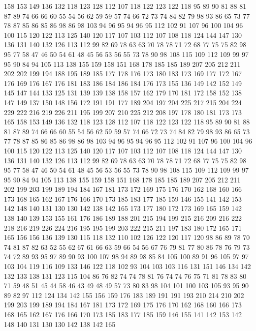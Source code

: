 158 153 149 136 132 118 123 128 112 107 118 122 123 122 118 95 89 90 81 88
81 87 89 74 66 66 60 55 54 56 62 59 59 57 74 66 72 73 74 84
82 79 98 93 86 65 73 77 78 87 85 86 85 86 98 86 98 103 94 96
95 94 96 95 112 102 91 107 96 100 104 96 100 115 120 122 113 125 140 120
117 107 103 112 107 108 118 124 144 147 130 136 131 140 132 126 113 112 99 82
69 78 63 63 70 78 78 71 72 68 77 75 75 82 98 95 77 58 47 46
50 54 61 48 45 56 53 56 55 73 78 90 98 108 115 109 112 109 99 97
95 90 84 94 105 113 138 155 159 158 151 168 178 185 185 189 207 205 212 211
202 202 199 194 188 195 189 185 177 178 176 173 180 183 173 169 177 172 167 176
169 176 167 176 181 183 186 184 186 184 176 173 155 136 149 142 152 149 145 147
144 133 125 131 139 139 138 158 157 162 179 170 181 172 158 152 138 147 149 137
150 148 156 172 191 191 177 189 204 197 204 225 217 215 204 224 229 222 216 219
226 211 195 199 207 210 225 212 208 197 178 180 181 173 173 165 158 153 149 136
132 118 123 128 112 107 118 122 123 122 118 95 89 90 81 88 81 87 89 74
66 66 60 55 54 56 62 59 59 57 74 66 72 73 74 84 82 79 98 93
86 65 73 77 78 87 85 86 85 86 98 86 98 103 94 96 95 94 96 95
112 102 91 107 96 100 104 96 100 115 120 122 113 125 140 120 117 107 103 112
107 108 118 124 144 147 130 136 131 140 132 126 113 112 99 82 69 78 63 63
70 78 78 71 72 68 77 75 75 82 98 95 77 58 47 46 50 54 61 48
45 56 53 56 55 73 78 90 98 108 115 109 112 109 99 97 95 90 84 94
105 113 138 155 159 158 151 168 178 185 185 189 207 205 212 211 202 199 203 199
189 194 184 167 181 173 172 169 175 176 170 162 168 160 166 173 168 165 162 167
176 166 170 173 185 183 177 185 159 146 155 141 142 153 142 148 140 131 130 130
142 138 142 165 173 177 180 172 173 169 165 159 142 138 140 139 153 155 161 176
186 189 188 201 215 194 199 215 216 209 216 222 218 216 219 226 224 216 195 195
199 203 222 215 211 197 183 180 172 165 171 165 156 156 136 139 130 115 118 132
110 102 126 122 120 117 120 98 86 89 78 70 74 81 87 82 63 52 55 62
67 61 66 63 59 66 54 56 67 76 79 81 77 80 86 78 76 79 73 74
72 89 93 95 97 89 90 93 100 107 98 94 89 98 85 84 105 100 89 91
96 105 97 97 103 104 119 116 109 133 146 122 118 102 93 104 103 103 116 131
151 146 134 142 132 133 138 131 123 115 104 86 76 82 74 74 78 81 76 74
74 76 75 71 81 78 83 80 71 59 48 51 45 44 58 46 43 49 48 49
57 73 80 83 98 104 101 100 103 105 93 95 90 89 82 97 112 124 134 142
155 156 159 176 183 189 191 191 193 210 214 210 202 199 203 199 189 194 184 167
181 173 172 169 175 176 170 162 168 160 166 173 168 165 162 167 176 166 170 173
185 183 177 185 159 146 155 141 142 153 142 148 140 131 130 130 142 138 142 165
